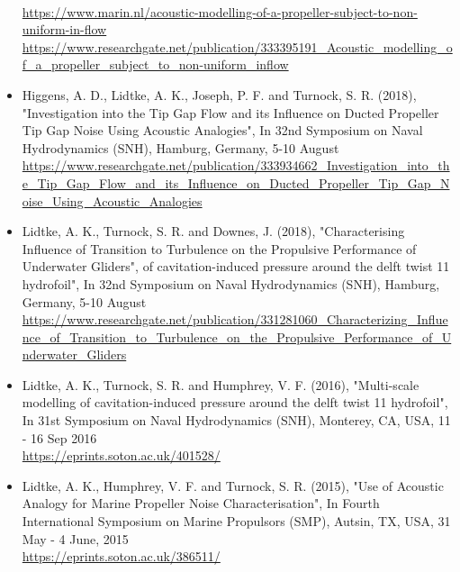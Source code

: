 \documentclass[a4paper,10pt]{article}
\begin{document}
\begin{itemize}
	\cite{Lidtke2019a}
	\\ \url{https://www.marin.nl/acoustic-modelling-of-a-propeller-subject-to-non-uniform-in-flow}
	\\ \url{https://www.researchgate.net/publication/333395191\_Acoustic\_modelling\_of\_a\_propeller\_subject\_to\_non-uniform\_inflow}
%
\item Higgens, A. D., Lidtke, A. K., Joseph, P. F. and Turnock, S. R. (2018),
	"Investigation into the Tip Gap Flow and its Influence on Ducted Propeller Tip Gap Noise Using Acoustic Analogies",
	In 32nd Symposium on Naval Hydrodynamics (SNH), Hamburg, Germany, 5-10 August
	\cite{Higgens2018}
	\\ \url{https://www.researchgate.net/publication/333934662\_Investigation\_into\_the\_Tip\_Gap\_Flow\_and\_its\_Influence\_on\_Ducted\_Propeller\_Tip\_Gap\_Noise\_Using\_Acoustic\_Analogies}
%
\item Lidtke, A. K., Turnock, S. R. and Downes, J. (2018),
	"Characterising Influence of Transition to Turbulence on the Propulsive Performance of Underwater Gliders",
	of cavitation-induced pressure around the delft twist 11 hydrofoil",
	In 32nd Symposium on Naval Hydrodynamics (SNH), Hamburg, Germany, 5-10 August
	\cite{Lidtke2018}
	\\ \url{https://www.researchgate.net/publication/331281060_Characterizing_Influence_of_Transition_to_Turbulence_on_the_Propulsive_Performance_of_Underwater_Gliders}
%
\item Lidtke, A. K., Turnock, S. R. and Humphrey, V. F. (2016), "Multi-scale modelling
	of cavitation-induced pressure around the delft twist 11 hydrofoil",
	In 31st Symposium on Naval Hydrodynamics (SNH), Monterey, CA, USA, 11 - 16 Sep 2016
	\cite{Lidtke2016b}
	\\ \url{https://eprints.soton.ac.uk/401528/}
%
\item Lidtke, A. K., Humphrey, V. F. and Turnock, S. R. (2015), "Use of Acoustic
	Analogy for Marine Propeller Noise Characterisation", In Fourth International
	Symposium on Marine Propulsors (SMP), Autsin, TX, USA, 31 May - 4 June, 2015
	\cite{Lidtke2015a}
	\\ \url{https://eprints.soton.ac.uk/386511/}
%
\end{itemize}

\end{document}
